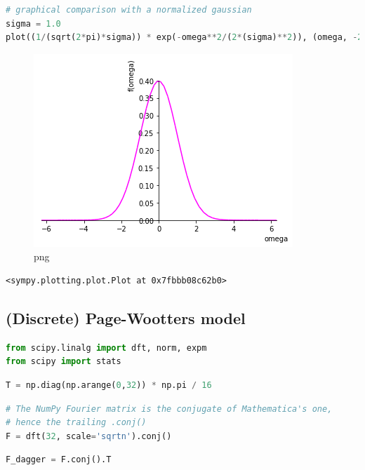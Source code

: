 \begin{lstlisting}[language=Python]
# graphical comparison with a normalized gaussian
sigma = 1.0
plot((1/(sqrt(2*pi)*sigma)) * exp(-omega**2/(2*(sigma)**2)), (omega, -2*pi, 2*pi), line_color='magenta')
\end{lstlisting}

\begin{figure}
\centering
\includegraphics[width=0.66\linewidth]{output_60_0.png}
\caption{png}
\end{figure}

\begin{lstlisting}
<sympy.plotting.plot.Plot at 0x7fbbb08c62b0>
\end{lstlisting}

\hypertarget{discrete-page-wootters-model}{%
\subsection{(Discrete) Page-Wootters
model}\label{discrete-page-wootters-model}}

\begin{lstlisting}[language=Python]
from scipy.linalg import dft, norm, expm
from scipy import stats
\end{lstlisting}

\begin{lstlisting}[language=Python]
T = np.diag(np.arange(0,32)) * np.pi / 16
\end{lstlisting}

\begin{lstlisting}[language=Python]
# The NumPy Fourier matrix is the conjugate of Mathematica's one,
# hence the trailing .conj() 
F = dft(32, scale='sqrtn').conj()
\end{lstlisting}

\begin{lstlisting}[language=Python]
F_dagger = F.conj().T
\end{lstlisting}

